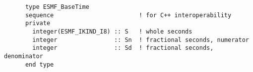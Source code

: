 \begin{verbatim}
      type ESMF_BaseTime
      sequence                        ! for C++ interoperability
      private
        integer(ESMF_IKIND_I8) :: S   ! whole seconds
        integer                :: Sn  ! fractional seconds, numerator
        integer                :: Sd  ! fractional seconds, denominator
      end type
\end{verbatim}
